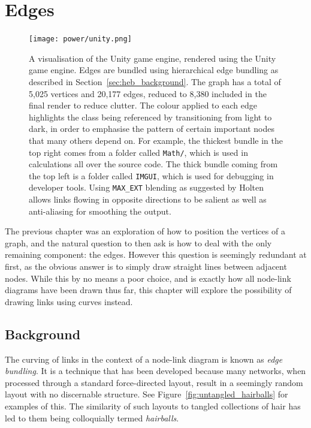 \chapter{Edges}
\label{chap:power}
\begin{figure}
  \centering
  \texttt{[image: power/unity.png]}
  \caption[The Unity game engine, visualised using the Unity game engine]{A visualisation of the Unity game engine, rendered using the Unity game engine. 
  Edges are bundled using hierarchical edge bundling as described in Section~\ref{sec:heb_background}. The graph has a total of 5,025 vertices and 20,177 edges, reduced to 8,380 included in the final render to reduce clutter. The colour applied to each edge highlights the class being referenced by transitioning from light to dark, in order to emphasise the pattern of certain important nodes that many others depend on. For example, the thickest bundle in the top right comes from a folder called \texttt{Math/}, which is used in calculations all over the source code. The thick bundle coming from the top left is a folder called \texttt{IMGUI}, which is used for debugging in developer tools.
  Using \texttt{MAX\_EXT} blending as suggested by Holten \cite{Holten2006} allows links flowing in opposite directions to be salient as well as anti-aliasing for smoothing the output.}
  \label{fig:metaunity}
\end{figure}
The previous chapter was an exploration of how to position the vertices of a graph, and the natural question to then ask is how to deal with the only remaining component: the edges. However this question is seemingly redundant at first, as the obvious answer is to simply draw straight lines between adjacent nodes. While this by no means a poor choice, and is exactly how all node-link diagrams have been drawn thus far, this chapter will explore the possibility of drawing links using curves instead.

\section{Background}
\label{sec:edges_background}
The curving of links in the context of a node-link diagram is known as \textit{edge bundling}. It is a technique that has been developed because many networks, when processed through a standard force-directed layout, result in a seemingly random layout with no discernable structure. See Figure~\ref{fig:untangled_hairballs} for examples of this. The similarity of such layouts to tangled collections of hair has led to them being colloquially termed \textit{hairballs}.

